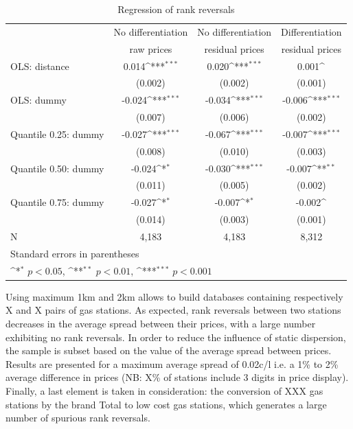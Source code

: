 \documentclass[11pt]{article}
\begin{document}
\begin{table}[htbp]\centering
\def\sym#1{\ifmmode^{#1}\else\(^{#1}\)\fi}
\caption{Regression of rank reversals}
\begin{tabular}{lccc}
\hline
\hline
{} & No differentiation & No differentiation & Differentiation \\
{} & raw prices & residual prices & residual prices \\
\hline
OLS: distance                   & 0.014\sym{***}    &  0.020\sym{***}  &       0.001\sym{}\\
{}                                      &  (0.002)                 & (0.002)                 &     (0.001)   \\
OLS: dummy                     &  -0.024\sym{***} & -0.034\sym{***}  &     -0.006\sym{***}\\
{}                                      & (0.007)                  &(0.006)                  &     (0.002) \\
Quantile 0.25: dummy      & -0.027\sym{***}  &-0.067\sym{***}   &       -0.007\sym{***}\\
{}                                      &    (0.008)               & (0.010)                 &     (0.003)  \\
Quantile 0.50: dummy      & -0.024\sym{*}      & -0.030\sym{***}  &       -0.007\sym{**}\\
{}                                      &  (0.011)                 & (0.005)                 &     (0.002)    \\
Quantile 0.75: dummy      & -0.027\sym{*}      & -0.007\sym{*}      &       -0.002\sym{}\\
{}                                      &     (0.014)              & (0.003)                 &     (0.001)   \\
\hline
N                                       & 4,183         &   4,183     &     8,312    \\
\hline\hline
\multicolumn{4}{l}{\footnotesize Standard errors in parentheses}\\
\multicolumn{4}{l}{\footnotesize \sym{*} \(p<0.05\), \sym{**} \(p<0.01\), \sym{***} \(p<0.001\)}\\
\end{tabular}
\end{table}

Using maximum 1km and 2km allows to build databases containing respectively X and X pairs of gas stations. As expected, rank reversals between two stations decreases in the average spread between their prices, with a large number exhibiting no rank reversals. In order to reduce the influence of static dispersion, the sample is subset based on the value of the average spread between prices. Results are presented for a maximum average spread of 0.02c/l i.e. a 1\% to 2\% average difference in prices (NB: X\% of stations include 3 digits in price display). Finally, a last element is taken in consideration: the conversion of XXX gas stations by the brand Total to low cost gas stations, which generates a large number of spurious rank reversals.
\end{document}
